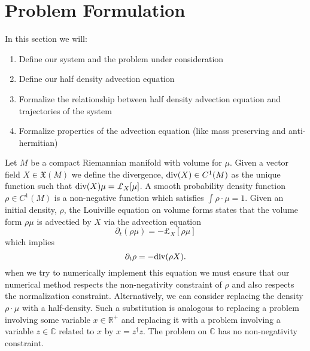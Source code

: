 \section{Problem Formulation}\label{sec:Formulation}
In this section we will:
\begin{enumerate}
	\item Define our system and the problem under consideration
	\item Define our half density advection equation
	\item Formalize the relationship between half density advection equation and trajectories of the system
	\item Formalize properties of the advection equation (like mass preserving and anti-hermitian)
\end{enumerate}

Let $M$ be a compact Riemannian manifold with volume for $\mu$.  Given a vector field $X \in \mathfrak{X}(M)$ we define the divergence, ${\rm div}(X) \in C^1(M)$ as the unique function such that ${\rm div}(X) \mu = \pounds_X [ \mu ]$.
A smooth probability density function $\rho \in C^1(M)$ is a non-negative function which satisfies $\int \rho \cdot \mu = 1$.  Given an initial density, $\rho$, the Louiville equation on volume forms states that the volume form $\rho \mu$ is advectied by $X$ via the advection equation
\[
	\partial_t (\rho \mu) = - \pounds_X [ \rho \mu]
\]
which implies
\[
	\partial_t \rho = - {\rm div}( \rho X ).
\]
when we try to numerically implement this equation we must ensure that our numerical method respects the non-negativity constraint of $\rho$ and also respects the normalization constraint.
Alternatively, we can consider replacing the density $\rho \cdot \mu$ with a half-density.
Such a substitution is analogous to replacing a problem involving some variable $x \in \mathbb{R}^+$ and replacing it with a problem involving a variable $z \in \mathbb{C}$ related to $x$ by $x = z^\dagger z$.
The problem on $\mathbb{C}$ has no non-negativity constraint.


